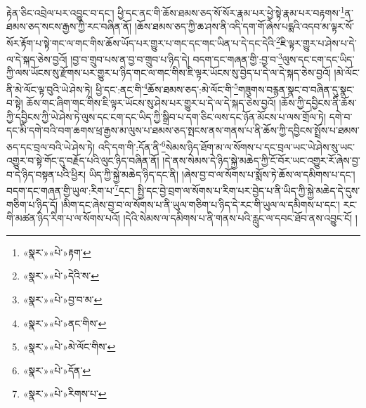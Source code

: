 རྟེན་ཅིང་འབྲེལ་པར་འབྱུང་བ་དང་། ཕྱི་དང་ནང་གི་ཆོས་ཐམས་ཅད་སོ་སོར་རྣམ་པར་ཕྱེ་སྟེ་རྣམ་པར་བརྟགས་\footnote{«སྣར་»«པེ་»རྟག་}ན་ཐམས་ཅད་སངས་རྒྱས་ཀྱི་རང་བཞིན་ནོ། །ཆོས་ཐམས་ཅད་ཀྱི་ཆ་ཤས་ནི་འདི་དག་གོ་ཞེས་པདྨའི་འདབ་མ་ལྟར་སོ་སོར་རྟོག་པ་སྟེ་གང་ལ་གང་གིས་ཆོས་ཡོད་པར་གྱུར་པ་གང་དང་གང་ཡིན་པ་དེ་དང་དེའི་\footnote{«སྣར་»«པེ་»དེའི་ས་}ཇི་ལྟར་གྱུར་པ་ཤེས་པ་དེ་ལ་དེ་སྐད་ཅེས་བྱའོ། །བྱ་བ་གྲུབ་པས་ན་བྱ་བ་གྲུབ་པ་ཉིད་དེ། བདག་དང་གཞན་གྱི་:བྱ་བ་\footnote{«སྣར་»«པེ་»བྱ་བ་མ་}ལུས་དང་ངག་དང་ཡིད་ཀྱི་ལས་ཡོངས་སུ་རྫོགས་པར་གྱུར་པ་ཉིད་གང་ལ་གང་གིས་ཇི་ལྟར་ཡོངས་སུ་བྱེད་པ་དེ་ལ་དེ་སྐད་ཅེས་བྱའོ། །མེ་ལོང་ནི་མེ་ལོང་ལྟ་བུའི་ཡེ་ཤེས་ཏེ། ཕྱི་དང་:ནང་གི་\footnote{«སྣར་»«པེ་»ནང་གིས་}ཆོས་ཐམས་ཅད་:མེ་ལོང་གི་\footnote{«སྣར་»«པེ་»མེ་ལོང་གིས་}གཟུགས་བརྙན་སྣང་བ་བཞིན་དུ་སྣང་བ་སྟེ། ཆོས་གང་ཞིག་གང་གིས་ཇི་ལྟར་ཡོངས་སུ་ཤེས་པར་གྱུར་པ་དེ་ལ་དེ་སྐད་ཅེས་བྱའོ། །ཆོས་ཀྱི་དབྱིངས་ནི་ཆོས་ཀྱི་དབྱིངས་ཀྱི་ཡེ་ཤེས་ཏེ་ལུས་དང་ངག་དང་ཡིད་ཀྱི་སྒྲིབ་པ་དག་ཅིང་ལས་དང་ཉོན་མོངས་པ་ལས་གྲོལ་ཏེ། དགེ་བ་དང་མི་དགེ་བའི་བག་ཆགས་ཕྲ་རྒྱས་མ་ལུས་པ་ཐམས་ཅད་སྤངས་ནས་གནས་པ་ནི་ཆོས་ཀྱི་དབྱིངས་སྤྲོས་པ་ཐམས་ཅད་དང་བྲལ་བའི་ཡེ་ཤེས་ཏེ། འདི་དག་གི་:དོན་ནི་\footnote{«སྣར་»«པེ་»དོན་}སེམས་ཉིད་ཐོག་མ་ལ་སོགས་པ་དང་བྲལ་ཡང་ཡེ་ཤེས་སུ་ཡང་འགྱུར་བ་སྟེ་གོང་དུ་བརྗོད་པའི་ལུང་ཉིད་བཞིན་ནོ། །དེ་ནས་སེམས་དེ་ཉིད་སྐྱེ་མཆེད་ཀྱི་ངོ་བོར་ཡང་འགྱུར་རོ་ཞེས་བྱ་བ་དེ་ཉིད་བསྟན་པའི་ཕྱིར། ཡིད་ཀྱི་སྐྱེ་མཆེད་ཉིད་དང་ནི། །ཞེས་བྱ་བ་ལ་སོགས་པ་སྨོས་ཏེ་ཆོས་ལ་དམིགས་པ་དང་། བདག་དང་གཞན་གྱི་ཡུལ་:རིག་པ་\footnote{«སྣར་»«པེ་»རིགས་པ་}དང་། སྤྱི་དང་བྱེ་བྲག་ལ་སོགས་པ་རིག་པར་བྱེད་པ་ནི་ཡིད་ཀྱི་སྐྱེ་མཆེད་དེ་དུས་གཅིག་པ་ཉིད་དོ། །མིག་དང་ཞེས་བྱ་བ་ལ་སོགས་པ་ནི་ཡུལ་གཅིག་པ་ཉིད་དེ་རང་གི་ཡུལ་ལ་དམིགས་པ་དང་། རང་གི་མཚན་ཉིད་རིག་པ་ལ་སོགས་པའོ། །དེའི་སེམས་ལ་དམིགས་པ་ནི་གནས་པའི་རླུང་ལ་དབང་ཐོབ་ནས་འབྱུང་ངོ། །
